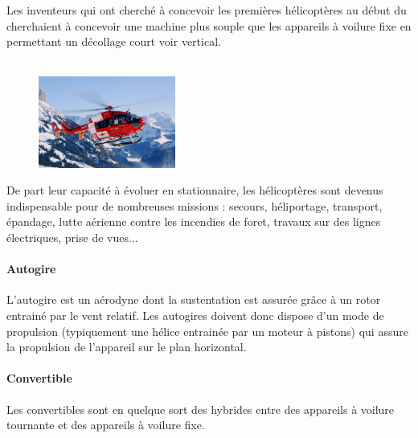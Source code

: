 		Les inventeurs qui ont cherché à concevoir les premières hélicoptères au début du  cherchaient à concevoir une machine plus souple que les appareils à voilure fixe en permettant un décollage court voir vertical. \\
		
		\\
		
	\begin{figure}[H]
  	\centering
    \includegraphics[width=0.4\textwidth]{01-EtudeAeronefs/img/helicoptereEC145.jpg}
	\end{figure}	
		
		De part leur capacité à évoluer en stationnaire, les hélicoptères sont devenus indispensable pour de nombreuses missions : secours, héliportage, transport, épandage, lutte aérienne contre les incendies de foret, travaux sur des lignes électriques, prise de vues...
		
		\paragraph{Autogire}
		L'autogire  est un aérodyne dont la sustentation est assurée grâce à un rotor entrainé par le vent relatif. Les autogires doivent donc dispose d'un mode de propulsion (typiquement une hélice entrainée par un moteur à pistons) qui assure la propulsion de l'appareil sur le plan horizontal.
		
		
		\paragraph{Convertible}
		Les convertibles  sont en quelque sort des hybrides entre des appareils à voilure tournante et des appareils à voilure fixe.
		
